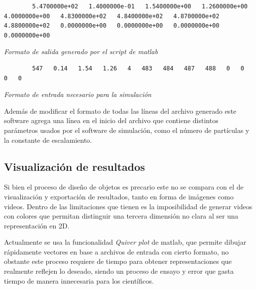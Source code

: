 \begin{center}
	\begin{lstlisting}
		5.4700000e+02   1.4000000e-01   1.5400000e+00   1.2600000e+00   4.0000000e+00   4.8300000e+02   4.8400000e+02   4.8700000e+02   4.8800000e+02   0.0000000e+00   0.0000000e+00   0.0000000e+00   0.0000000e+00
	\end{lstlisting}
	\em Formato de salida generado por el script de matlab
\end{center}

\begin{center}
	\begin{lstlisting}
		547   0.14   1.54   1.26   4   483   484   487   488   0   0   0   0
	\end{lstlisting}
	\em Formato de entrada necesario para la simulación
\end{center}

Además de modificar el formato de todas las líneas del archivo generado este software agrega una línea en el inicio del archivo que contiene distintos parámetros usados por el software de simulación, como el número de partículas y la constante de escalamiento.

\subsection{Visualización de resultados}

Si bien el proceso de diseño de objetos es precario este no se compara con el de visualización y exportación de resultados, tanto en forma de imágenes como videos. Dentro de las limitaciones que tienen es la imposibilidad de generar videos con colores que permitan distinguir una tercera dimensión no clara al ser una representación en 2D.

Actualmente se usa la funcionalidad \emph{Quiver plot} de matlab, que permite dibujar rápidamente vectores en base a archivos de entrada con cierto formato, no obstante este proceso requiere de tiempo para obtener representaciones que realmente reflejen lo deseado, siendo un proceso de ensayo y error que gasta tiempo de manera innecesaria para los científicos.


